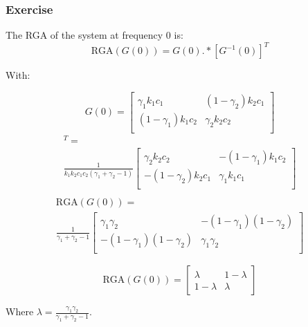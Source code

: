 \subsubsection{Exercise} 

The RGA of the system at frequency 0 is:
$$
\text{RGA}(G(0)) = G(0).\ast[G^{-1}(0)]^T 
$$

With:

\begin{equation*}
    G(0) =
\left[
    \begin{array}{cc}
        \gamma_1k_1c_1 & (1-\gamma_2)k_2c_1 \\
        (1-\gamma_1)k_1c_2 & \gamma_2k_2c_2 \\
    \end{array}
\right]
\end{equation*}
\begin{multline*}
[G^{-1}(0)]^T = \\
\frac{1}{k_1k_2c_1c_2(\gamma_1+\gamma_2-1)}
\left[
    \begin{array}{cc}
        \gamma_2k_2c_2 & -(1-\gamma_1)k_1c_2 \\
        -(1-\gamma_2)k_2c_1 & \gamma_1k_1c_1 \\
    \end{array}
\right]\\
\end{multline*}
\begin{multline*}
    \text{RGA}(G(0)) =\\ 
\frac{1}{\gamma_1+\gamma_2-1}
\left[
    \begin{array}{cc}
        \gamma_1\gamma_2 & -(1-\gamma_1)(1-\gamma_2) \\
        -(1-\gamma_1)(1-\gamma_2) & \gamma_1\gamma_2 \\
    \end{array}
\right]
\end{multline*}

\begin{equation}
    \boxed{
    \text{RGA}(G(0)) =
    \left[
        \begin{array}{cc}
            \lambda & 1 - \lambda \\
            1 - \lambda & \lambda
        \end{array}
    \right]
}
\end{equation}

Where $\lambda = \frac{\gamma_1\gamma_2}{\gamma_1+\gamma_2-1}$.
